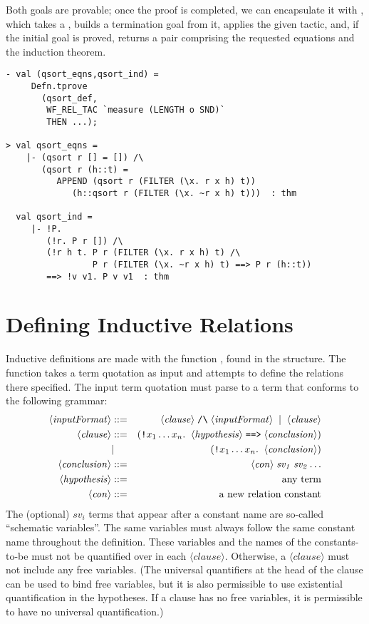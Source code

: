 Both goals are provable; once the proof is completed, we can
encapsulate it with , which takes a , builds
a termination goal from it, applies the given tactic, and, if the
initial goal is proved, returns a pair comprising the requested
equations and the induction theorem.

\begin{session}
\begin{verbatim}
- val (qsort_eqns,qsort_ind) =
     Defn.tprove
       (qsort_def,
        WF_REL_TAC `measure (LENGTH o SND)`
        THEN ...);

> val qsort_eqns =
    |- (qsort r [] = []) /\
       (qsort r (h::t) =
          APPEND (qsort r (FILTER (\x. r x h) t))
             (h::qsort r (FILTER (\x. ~r x h) t)))  : thm

  val qsort_ind =
     |- !P.
        (!r. P r []) /\
        (!r h t. P r (FILTER (\x. r x h) t) /\
                 P r (FILTER (\x. ~r x h) t) ==> P r (h::t))
        ==> !v v1. P v v1  : thm
\end{verbatim}
\end{session}

\section{Defining Inductive Relations}

Inductive definitions are made with the function , found
in the \ml{bossLib} structure.  The  function takes a
term quotation as input and attempts to define the relations there
specified.  The input term quotation must parse to a term that
conforms to the following grammar:
\newcommand{\nonterm}[1]{\ensuremath{\langle\mathit{#1}\rangle}}
\begin{eqnarray*}
   \nonterm{inputFormat} &::=& \nonterm{clause} \;\holtxt{/\bk}\; \nonterm{inputFormat} \;\;|\;\; \nonterm{clause}\\
   \nonterm{clause}       &::=& (\holtxt{!}x_1 \dots
   x_n. \;\;\nonterm{hypothesis} \;\holtxt{==>}
   \;\nonterm{conclusion})\\
   &|& (\holtxt{!}x_1\dots x_n.\;\;\nonterm{conclusion})\\
   \nonterm{conclusion}   &::=& \nonterm{con} \;\mathit{sv_1}\; \mathit{sv_2} \dots\\
   \nonterm{hypothesis}   &::=& \mbox{any term}\\
   \nonterm{con}          &::=& \mbox{a new relation constant}
\end{eqnarray*}
The (optional) $\mathit{sv}_i$ terms that appear after a constant name are
so-called ``schematic variables''.  The same variables must always
follow the same constant name throughout the definition.  These
variables and the names of the constants-to-be must not be quantified
over in each {\nonterm{clause}}.  Otherwise, a {\nonterm{clause}} must
not include any free variables.  (The universal quantifiers at the
head of the clause can be used to bind free variables, but it is also
permissible to use existential quantification in the hypotheses.  If a
clause has no free variables, it is permissible to have no universal
quantification.)

